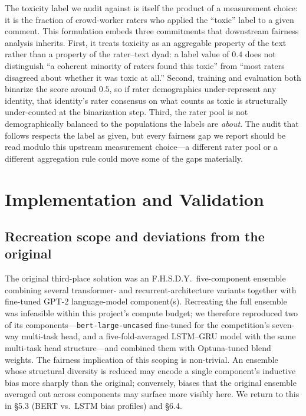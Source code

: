 \documentclass[11pt]{article}
\begin{document}
The toxicity label we audit against is itself the product of a measurement choice: it is the fraction of crowd-worker raters who applied the ``toxic'' label to a given comment. This formulation embeds three commitments that downstream fairness analysis inherits. First, it treats toxicity as an aggregable property of the text rather than a property of the rater--text dyad: a label value of $0.4$ does not distinguish ``a coherent minority of raters found this toxic'' from ``most raters disagreed about whether it was toxic at all.'' Second, training and evaluation both binarize the score around $0.5$, so if rater demographics under-represent any identity, that identity's rater consensus on what counts as toxic is structurally under-counted at the binarization step. Third, the rater pool is not demographically balanced to the populations the labels are \emph{about}. The audit that follows respects the label as given, but every fairness gap we report should be read modulo this upstream measurement choice---a different rater pool or a different aggregation rule could move some of the gaps materially.

\section{Implementation and Validation}

\subsection{Recreation scope and deviations from the original}

The original third-place solution was an F.H.S.D.Y.\ five-component ensemble combining several transformer- and recurrent-architecture variants together with fine-tuned GPT-2 language-model component(s). Recreating the full ensemble was infeasible within this project's compute budget; we therefore reproduced two of its components---\texttt{bert-large-uncased} fine-tuned for the competition's seven-way multi-task head, and a five-fold-averaged LSTM--GRU model with the same multi-task head structure---and combined them with Optuna-tuned blend weights. The fairness implication of this scoping is non-trivial. An ensemble whose structural diversity is reduced may encode a single component's inductive bias more sharply than the original; conversely, biases that the original ensemble averaged out across components may surface more visibly here. We return to this in \S5.3 (BERT vs.\ LSTM bias profiles) and \S6.4.
\end{document}
